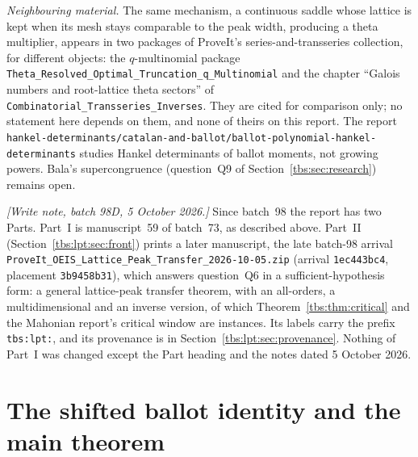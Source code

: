 \documentclass[11pt,a4paper]{article}
\numberwithin{equation}{section}
\theoremstyle{definition}
\newcommand{\code}[1]{\texttt{#1}}
\begin{document}
\emph{Neighbouring material.} The same mechanism, a continuous saddle
whose lattice is kept when its mesh stays comparable to the peak width,
producing a theta multiplier, appears in two packages of ProveIt's
series-and-transseries collection, for different objects: the
$q$-multinomial package \nolinkurl{Theta_Resolved_Optimal_Truncation_q_Multinomial}
and the chapter ``Galois numbers and root-lattice theta sectors'' of
\nolinkurl{Combinatorial_Transseries_Inverses}. They are cited for comparison
only; no statement here depends on them, and none of theirs on this
report. The report
\nolinkurl{hankel-determinants/catalan-and-ballot/ballot-polynomial-hankel-determinants}
studies Hankel determinants of ballot moments, not growing powers. Bala's
supercongruence (question~Q9 of Section~\ref{tbs:sec:research}) remains
open.

\emph{[Write note, batch 98D, 5 October 2026.]} Since batch~98 the report
has two Parts. Part~I is manuscript~59 of batch~73, as described above.
Part~II (Section~\ref{tbs:lpt:sec:front}) prints a later manuscript, the
late batch-98 arrival \nolinkurl{ProveIt_OEIS_Lattice_Peak_Transfer_2026-10-05.zip}
(arrival \code{1ec443bc4}, placement \code{3b9458b31}), which answers
question~Q6 in a sufficient-hypothesis form: a general lattice-peak
transfer theorem, with an all-orders, a multidimensional and an inverse
version, of which Theorem~\ref{tbs:thm:critical} and the Mahonian
report's critical window are instances. Its labels carry the prefix
\code{tbs:lpt:}, and its provenance is in
Section~\ref{tbs:lpt:sec:provenance}. Nothing of Part~I was changed
except the Part heading and the notes dated 5 October 2026.

\section{The shifted ballot identity and the main theorem}\label{tbs:sec:main}
\end{document}
